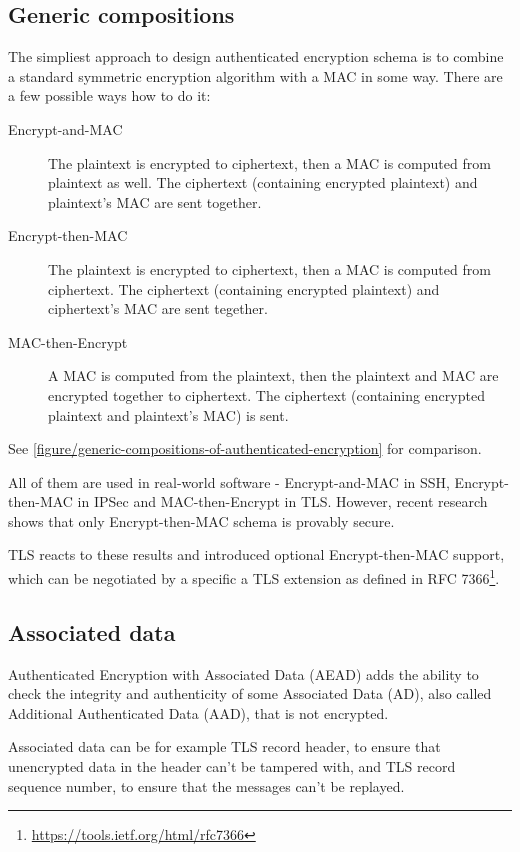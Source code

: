 \subsection{Generic compositions}
\label{toc/generic-compositions}



The simpliest approach to design authenticated encryption schema is to combine a standard symmetric encryption algorithm with a MAC in some way. There are a few possible ways how to do it:

\begin{description}
  \item[Encrypt-and-MAC] The plaintext is encrypted to ciphertext, then a MAC is computed from plaintext as well. The ciphertext (containing encrypted plaintext) and plaintext's MAC are sent together.
  \item[Encrypt-then-MAC] The plaintext is encrypted to ciphertext, then a MAC is computed from ciphertext. The ciphertext (containing encrypted plaintext) and ciphertext's MAC are sent tegether.
  \item[MAC-then-Encrypt] A MAC is computed from the plaintext, then the plaintext and MAC are encrypted together to ciphertext. The ciphertext (containing encrypted plaintext and plaintext's MAC) is sent.
\end{description}

See \autoref{figure/generic-compositions-of-authenticated-encryption} for comparison.

All of them are used in real-world software - Encrypt-and-MAC in SSH, Encrypt-then-MAC in IPSec and MAC-then-Encrypt in TLS. However, recent research shows that only Encrypt-then-MAC schema is provably secure. \cite{generic-ae} \cite{generic-ae2}

TLS reacts to these results and introduced optional Encrypt-then-MAC support, which can be negotiated by a specific a TLS extension as defined in RFC 7366\footnote{\url{https://tools.ietf.org/html/rfc7366}}.

\subsection{Associated data}

Authenticated Encryption with Associated Data (AEAD) adds the ability to check the integrity and authenticity of some Associated Data (AD), also called Additional Authenticated Data (AAD), that is not encrypted.

Associated data can be for example TLS record header, to ensure that unencrypted data in the header can't be tampered with, and TLS record sequence number, to ensure that the messages can't be replayed.
